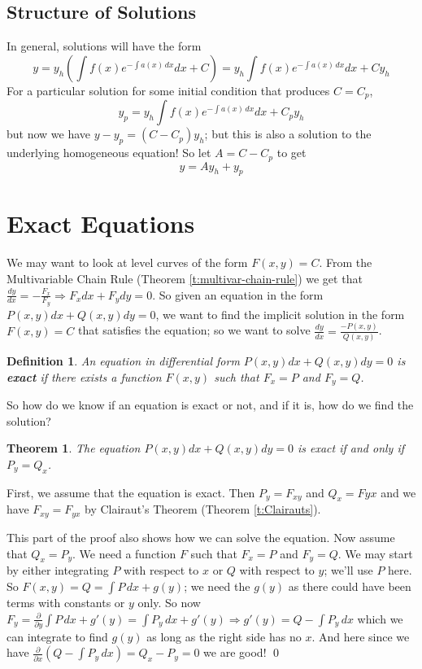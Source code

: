 \documentclass[letterpaper, 11pt, openany]{book}
\newcommand{\pd}[2]{\frac{\partial #1}{\partial #2}}
\theoremstyle{mytheoremstyle}
\newtheorem{theorem}{Theorem}[section]
\newtheorem{definition}{Definition}[section]
\renewenvironment{proof}{{\par \sffamily \smaller \fontseries{b}\selectfont Proof}}{\hfill\qed}
\theoremstyle{myexamplestyle}
\begin{document}
\subsection{Structure of Solutions}
In general, solutions will have the form
\[y = y_{h}\left(\int f(x) e^{-\int a(x)\, dx} dx + C\right) = y_{h}\int f(x) e^{-\int a(x)\, dx} dx + Cy_{h}\]
For a particular solution for some initial condition that produces \(C = C_{p}\),
\[y_{p} = y_{h}\int f(x) e^{-\int a(x)\, dx} dx + C_{p}y_{h}\]
but now we have \(y - y_{p} = (C-C_{p})y_{h}\); but this is also a solution to the underlying homogeneous equation! So let \(A = C-C_{p}\) to get
\[y = A y_{h} + y_{p}\]

\section{Exact Equations}
\setcounter{figure}{0}
We may want to look at level curves of the form \(F(x,y) = C\). From the Multivariable Chain Rule (Theorem \ref{t:multivar-chain-rule}) we get that \(\frac{dy}{dx} = - \frac{F_{x}}{F_{y}} \Rightarrow F_{x} dx + F_{y} dy = 0\). So given an equation in the form \(P(x,y) dx + Q(x,y)dy = 0\), we want to find the implicit solution in the form \(F(x,y) = C\) that satisfies the equation; so we want to solve \(\frac{dy}{dx} = \frac{-P(x,y)}{Q(x,y)}\).

\begin{definition}\label{d:exact-eqn}
    An equation in differential form \(P(x,y) dx + Q(x,y)dy = 0\) is \textbf{exact} if there exists a function \(F(x,y)\) such that \(F_{x} = P\) and \(F_{y} = Q\).
\end{definition}

So how do we know if an equation is exact or not, and if it is, how do we find the solution?

\begin{theorem}\label{t:exact-eqn-soln}
    The equation \(P(x,y) dx + Q(x,y) dy = 0\) is exact if and only if \(P_{y} = Q_{x}\).
\end{theorem}

\begin{proof}
    First, we assume that the equation is exact. Then \(P_{y} = F_{xy}\) and \(Q_{x} = F{yx}\) and we have \(F_{xy} = F_{yx}\) by Clairaut's Theorem (Theorem \ref{t:Clairauts}).

    This part of the proof also shows how we can solve the equation. Now assume that \(Q_{x} = P_{y}\). We need a function \(F\) such that \(F_{x} = P\) and \(F_{y} = Q\). We may start by either integrating \(P\) with respect to \(x\) or \(Q\) with respect to \(y\); we'll use \(P\) here. So \(F(x,y) = Q = \int P \, dx + g(y)\); we need the \(g(y)\) as there could have been terms with constants or \(y\) only. So now \(F_{y} = \pd{}{y}\int P \, dx + g'(y) = \int P_{y} \, dx + g'(y) \Rightarrow g'(y) = Q - \int P_{y} \, dx\) which we can integrate to find \(g(y)\) as long as the right side has no \(x\). And here since we have \(\pd{}{x} \left(Q - \int P_{y} \, dx\right) = Q_{x} - P_{y} = 0\) we are good!
\end{proof}
\end{document}
